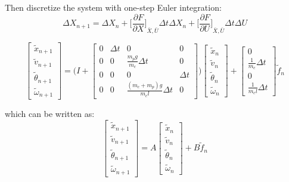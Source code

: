 Then discretize the system with one-step Euler integration:
\[
    \Delta X_{n+1} =
    \Delta X_n + {\Big[ \frac{\partial F}{\partial X} \Big]}_{\bar{X}, \bar{U}} \Delta t \Delta X_n + {\Big[ \frac{\partial F}{\partial U} \Big]}_{\bar{X}, \bar{U}} \Delta t \Delta U
\]

\[
    \begin{bmatrix}
        \tilde{x}_{n+1} \\
        \tilde{v}_{n+1} \\
        \tilde{\theta}_{n+1} \\
        \tilde{\omega}_{n+1}
    \end{bmatrix}
    =
    \Bigg(
        I
        +
        \begin{bmatrix}
            0 & \Delta t & 0 & 0 \\
            0 & 0 & \frac{m_p g}{m_c} \Delta t & 0 \\
            0 & 0 & 0 & \Delta t \\
            0 & 0 & \frac{(m_c + m_p) g}{m_c l} \Delta t & 0
        \end{bmatrix}
    \Bigg)
    \begin{bmatrix}
        \tilde{x}_n \\
        \tilde{v}_n \\
        \tilde{\theta}_n \\
        \tilde{\omega}_n
    \end{bmatrix}
    +
    \begin{bmatrix}
        0 \\
        \frac{1}{m_c} \Delta t \\
        0 \\
        \frac{1}{m_c l} \Delta t
    \end{bmatrix}
    \tilde{f}_n
\]

which can be written as:
\[
    \begin{bmatrix}
        \tilde{x}_{n+1} \\
        \tilde{v}_{n+1} \\
        \tilde{\theta}_{n+1} \\
        \tilde{\omega}_{n+1}
    \end{bmatrix}
    =
    A
    \begin{bmatrix}
        \tilde{x}_{n} \\
        \tilde{v}_{n} \\
        \tilde{\theta}_{n} \\
        \tilde{\omega}_{n}
    \end{bmatrix}
    + B \tilde{f}_n
\]

